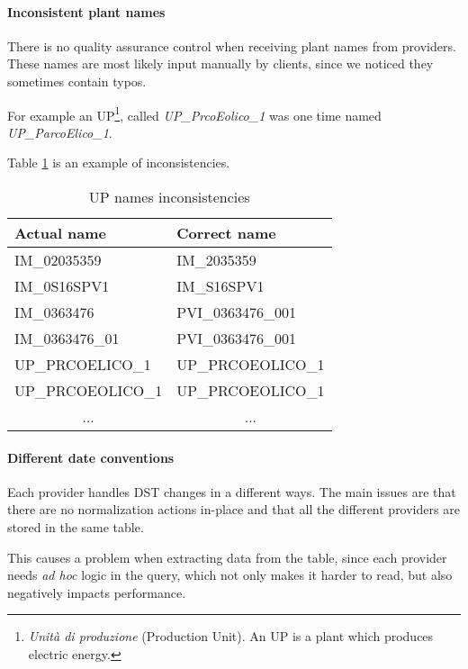     \paragraph{Inconsistent plant names}
        There is no quality assurance control when receiving plant names from providers.
        These names are most likely input manually by clients, since we noticed they sometimes contain typos.
        
        For example an UP\footnote{\textit{Unità di produzione} (Production Unit). An UP is a plant which produces electric energy.}, called \textit{UP\_PrcoEolico\_1} was one time named \textit{UP\_ParcoElico\_1}.
        
        Table \ref{tab:sbil:up_names} is an example of inconsistencies.
        
        \begin{table}
            \centering
            \begin{tabular}{|l|l|}
                \toprule
                Actual name         & Correct name      \\
                \midrule
                IM\_02035359        & IM\_2035359       \\
                IM\_0S16SPV1        & IM\_S16SPV1       \\
                IM\_0363476         & PVI\_0363476\_001 \\
                IM\_0363476\_01     & PVI\_0363476\_001 \\
                UP\_PRCOELICO\_1    & UP\_PRCOEOLICO\_1 \\
                UP\_PRCOEOLICO\_1   & UP\_PRCOEOLICO\_1 \\
                \multicolumn{1}{|c|}{...} & \multicolumn{1}{c|}{...} \\
                \bottomrule
            \end{tabular}
            \caption{UP names inconsistencies}
            \label{tab:sbil:up_names}
        \end{table}

        
    \paragraph{Different date conventions}
        Each provider handles DST changes in a different ways.
        The main issues are that there are no normalization actions in-place and that all the different providers are stored in the same table.
        
        This causes a problem when extracting data from the table, since each provider needs \textit{ad hoc} logic in the query, which not only makes it harder to read, but also negatively impacts performance.
        
